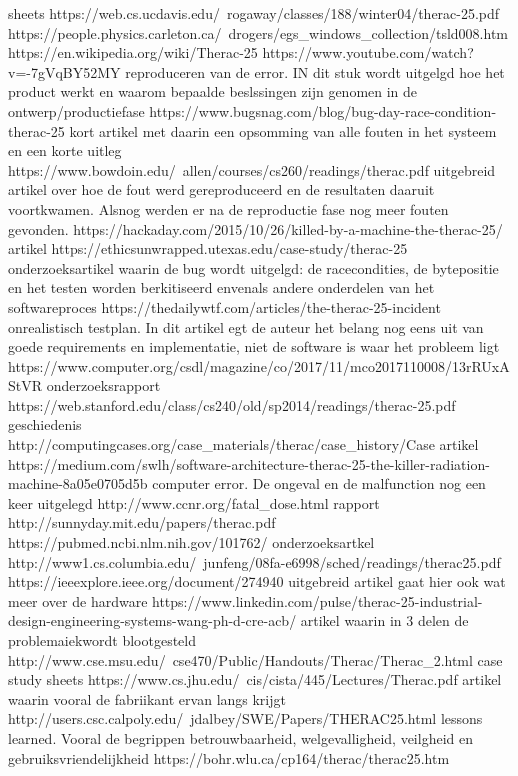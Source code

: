 sheets
https://web.cs.ucdavis.edu/~rogaway/classes/188/winter04/therac-25.pdf
https://people.physics.carleton.ca/~drogers/egs_windows_collection/tsld008.htm
https://en.wikipedia.org/wiki/Therac-25
https://www.youtube.com/watch?v=-7gVqBY52MY
reproduceren van de error. IN dit stuk wordt uitgelgd hoe het product werkt en waarom bepaalde beslssingen zijn genomen in de ontwerp/productiefase
https://www.bugsnag.com/blog/bug-day-race-condition-therac-25
kort artikel met daarin een opsomming van alle fouten in het systeem en een korte uitleg
https://www.bowdoin.edu/~allen/courses/cs260/readings/therac.pdf
uitgebreid artikel over hoe de fout werd gereproduceerd en de resultaten daaruit voortkwamen. Alsnog werden er na de reproductie fase nog meer fouten gevonden.
https://hackaday.com/2015/10/26/killed-by-a-machine-the-therac-25/
artikel
https://ethicsunwrapped.utexas.edu/case-study/therac-25
onderzoeksartikel waarin de bug wordt uitgelgd: de racecondities, de bytepositie en het testen worden berkitiseerd envenals andere onderdelen van het softwareproces
https://thedailywtf.com/articles/the-therac-25-incident
onrealistisch testplan. In dit artikel egt de auteur het belang nog eens uit van goede requirements en implementatie, niet de software is waar het probleem ligt
https://www.computer.org/csdl/magazine/co/2017/11/mco2017110008/13rRUxAStVR
onderzoeksrapport
https://web.stanford.edu/class/cs240/old/sp2014/readings/therac-25.pdf
geschiedenis
http://computingcases.org/case_materials/therac/case_history/Case%
artikel
https://medium.com/swlh/software-architecture-therac-25-the-killer-radiation-machine-8a05e0705d5b
computer error. De ongeval en de malfunction nog een keer uitgelegd
http://www.ccnr.org/fatal_dose.html
rapport
http://sunnyday.mit.edu/papers/therac.pdf
https://pubmed.ncbi.nlm.nih.gov/101762/
onderzoeksartkel
http://www1.cs.columbia.edu/~junfeng/08fa-e6998/sched/readings/therac25.pdf
https://ieeexplore.ieee.org/document/274940
uitgebreid artikel gaat hier ook wat meer over de hardware
https://www.linkedin.com/pulse/therac-25-industrial-design-engineering-systems-wang-ph-d-cre-acb/
artikel waarin in 3 delen de problemaiekwordt blootgesteld
http://www.cse.msu.edu/~cse470/Public/Handouts/Therac/Therac_2.html
case study sheets
https://www.cs.jhu.edu/~cis/cista/445/Lectures/Therac.pdf
artikel waarin vooral de fabriikant ervan langs krijgt
http://users.csc.calpoly.edu/~jdalbey/SWE/Papers/THERAC25.html
lessons learned. Vooral de begrippen betrouwbaarheid, welgevalligheid, veilgheid en gebruiksvriendelijkheid
https://bohr.wlu.ca/cp164/therac/therac25.htm
